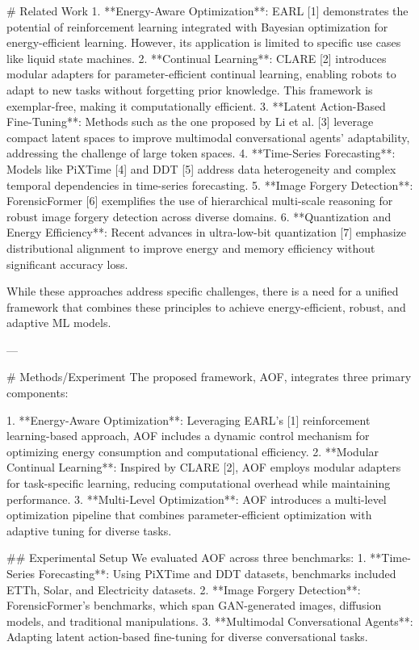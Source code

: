 # Related Work  
1. **Energy-Aware Optimization**: EARL [1] demonstrates the potential of reinforcement learning integrated with Bayesian optimization for energy-efficient learning. However, its application is limited to specific use cases like liquid state machines.  
2. **Continual Learning**: CLARE [2] introduces modular adapters for parameter-efficient continual learning, enabling robots to adapt to new tasks without forgetting prior knowledge. This framework is exemplar-free, making it computationally efficient.  
3. **Latent Action-Based Fine-Tuning**: Methods such as the one proposed by Li et al. [3] leverage compact latent spaces to improve multimodal conversational agents' adaptability, addressing the challenge of large token spaces.  
4. **Time-Series Forecasting**: Models like PiXTime [4] and DDT [5] address data heterogeneity and complex temporal dependencies in time-series forecasting.  
5. **Image Forgery Detection**: ForensicFormer [6] exemplifies the use of hierarchical multi-scale reasoning for robust image forgery detection across diverse domains.  
6. **Quantization and Energy Efficiency**: Recent advances in ultra-low-bit quantization [7] emphasize distributional alignment to improve energy and memory efficiency without significant accuracy loss.

While these approaches address specific challenges, there is a need for a unified framework that combines these principles to achieve energy-efficient, robust, and adaptive ML models.

---

# Methods/Experiment  
The proposed framework, AOF, integrates three primary components:  

1. **Energy-Aware Optimization**: Leveraging EARL's [1] reinforcement learning-based approach, AOF includes a dynamic control mechanism for optimizing energy consumption and computational efficiency.  
2. **Modular Continual Learning**: Inspired by CLARE [2], AOF employs modular adapters for task-specific learning, reducing computational overhead while maintaining performance.  
3. **Multi-Level Optimization**: AOF introduces a multi-level optimization pipeline that combines parameter-efficient optimization with adaptive tuning for diverse tasks.  

## Experimental Setup  
We evaluated AOF across three benchmarks:  
1. **Time-Series Forecasting**: Using PiXTime and DDT datasets, benchmarks included ETTh, Solar, and Electricity datasets.  
2. **Image Forgery Detection**: ForensicFormer's benchmarks, which span GAN-generated images, diffusion models, and traditional manipulations.  
3. **Multimodal Conversational Agents**: Adapting latent action-based fine-tuning for diverse conversational tasks.  

